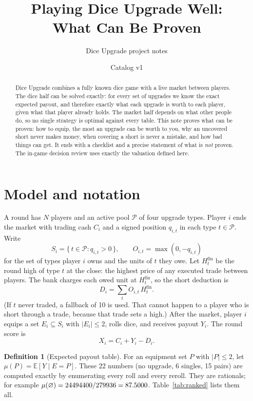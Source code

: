\documentclass[11pt]{article}
\title{Playing Dice Upgrade Well:\\ What Can Be Proven}
\author{Dice Upgrade project notes}
\date{Catalog v1}
\theoremstyle{definition}
\newtheorem{definition}[theorem]{Definition}
\newcommand{\E}{\mathbb{E}}
\newcommand{\Hf}{H^{\mathrm{fin}}}
\begin{document}
\maketitle

\begin{abstract}
Dice Upgrade combines a fully known dice game with a live market between players. The dice half can be solved exactly: for every set of upgrades we know the exact expected payout, and therefore exactly what each upgrade is worth to each player, given what that player already holds. The market half depends on what other people do, so no single strategy is optimal against every table. This note proves what can be proven: how to equip, the most an upgrade can be worth to you, why an uncovered short never makes money, when covering a short is never a mistake, and how bad things can get. It ends with a checklist and a precise statement of what is \emph{not} proven. The in-game decision review uses exactly the valuation defined here.
\end{abstract}

\tableofcontents

\section{Model and notation}

A round has $N$ players and an active pool $\mathcal P$ of four upgrade types. Player $i$ ends the market with trading cash $C_i$ and a signed position $q_{i,t}$ in each type $t \in \mathcal P$. Write
\[
  S_i = \{\, t \in \mathcal P : q_{i,t} > 0 \,\}, \qquad O_{i,t} = \max(0, -q_{i,t})
\]
for the set of types player $i$ owns and the units of $t$ they owe. Let $\Hf_t$ be the round high of type $t$ at the close: the highest price of any executed trade between players. The bank charges each owed unit at $\Hf_t$, so the short deduction is
\[
  D_i = \sum_{t} O_{i,t}\,\Hf_t .
\]
(If $t$ never traded, a fallback of 10 is used. That cannot happen to a player who is short through a trade, because that trade sets a high.) After the market, player $i$ equips a set $E_i \subseteq S_i$ with $|E_i| \le 2$, rolls dice, and receives payout $Y_i$. The round score is
\[
  X_i = C_i + Y_i - D_i .
\]

\begin{definition}[Expected payout table]
For an equipment set $P$ with $|P| \le 2$, let $\mu(P) = \E[Y \mid E = P]$. These 22 numbers (no upgrade, 6 singles, 15 pairs) are computed exactly by enumerating every roll and every reroll. They are rationals; for example $\mu(\varnothing) = 24494400/279936 = 87.5000$. Table~\ref{tab:ranked} lists them all.
\end{definition}
\end{document}
